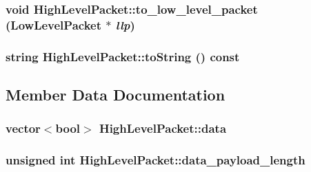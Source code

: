 \hypertarget{classHighLevelPacket_03017f87443d346d08e8ebb4281073c1}{
\subsubsection[{to\_\-low\_\-level\_\-packet}]{\setlength{\rightskip}{0pt plus 5cm}void HighLevelPacket::to\_\-low\_\-level\_\-packet ({\bf LowLevelPacket} $\ast$ {\em llp})}}
\label{classHighLevelPacket_03017f87443d346d08e8ebb4281073c1}


\hypertarget{classHighLevelPacket_a2292ef0554d515cf08aeed8ca46d419}{
\subsubsection[{toString}]{\setlength{\rightskip}{0pt plus 5cm}string HighLevelPacket::toString () const}}
\label{classHighLevelPacket_a2292ef0554d515cf08aeed8ca46d419}




\subsection{Member Data Documentation}
\hypertarget{classHighLevelPacket_340b7688df206e49a62301e2dae093de}{
\subsubsection[{data}]{\setlength{\rightskip}{0pt plus 5cm}vector$<$bool$>$ {\bf HighLevelPacket::data}}}
\label{classHighLevelPacket_340b7688df206e49a62301e2dae093de}


\hypertarget{classHighLevelPacket_c7bf05e9b1560991d60ca12fd0d309a3}{
\subsubsection[{data\_\-payload\_\-length}]{\setlength{\rightskip}{0pt plus 5cm}unsigned int {\bf HighLevelPacket::data\_\-payload\_\-length}}}
\label{classHighLevelPacket_c7bf05e9b1560991d60ca12fd0d309a3}


